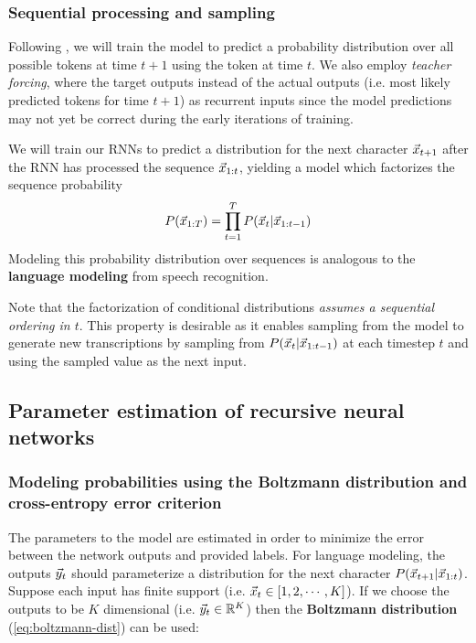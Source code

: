 \documentclass[dissertation.tex]{subfiles}
\begin{document}
\subsubsection{Sequential processing and sampling}

Following \cite{1994neural}, we will train the model to predict a probability
distribution over all possible tokens at time $t+1$ using the token at time
$t$. We also employ \emph{teacher forcing}\cite{williams1989learning}, where
the target outputs instead of the actual outputs (i.e. most likely predicted
tokens for time $t+1$) as recurrent inputs since the model predictions may not
yet be correct during the early iterations of training.

We will train our RNNs to predict a distribution for the next character
$\vec{x}_{t+1}$ after the RNN has processed the sequence $\vec{x}_{1:t}$,
yielding a model which factorizes the sequence probability
\begin{equation}
    P(\vec{x}_{1:T}) = \prod_{t=1}^T P(\vec{x}_t | \vec{x}_{1:t-1} )
\end{equation}
Modeling this probability distribution over sequences is analogous to the
\textbf{language modeling} from speech recognition.

Note that the factorization of conditional distributions \emph{assumes a
sequential ordering in $t$}. This property is desirable as it enables sampling
from the model to generate new transcriptions by sampling from $P(\vec{x}_t |
\vec{x}_{1:t-1})$ at each timestep $t$ and using the sampled value as the next
input.

\subsection{Parameter estimation of recursive neural networks}


\subsubsection{Modeling probabilities using the Boltzmann distribution and cross-entropy error criterion}

The parameters to the model are estimated in order to minimize the error
between the network outputs and provided labels. For language modeling, the
outputs $\vec{y}_t$ should parameterize a distribution for the next character
$P(\vec{x}_{t+1} | \vec{x}_{1:t})$. Suppose each input has finite support (i.e.
$\vec{x}_t \in [1,2,\cdots,K]$). If we choose the outputs to be $K$ dimensional
(i.e. $\vec{y}_t \in \mathbb{R}^K$) then the \textbf{Boltzmann distribution}
(\autoref{eq:boltzmann-dist}) can be used:
\end{document}
